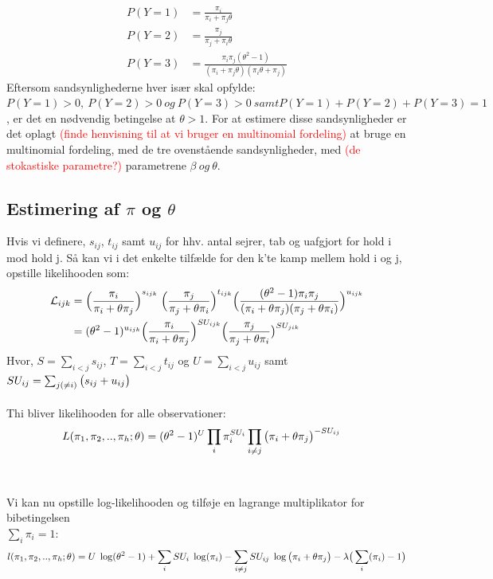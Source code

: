 \documentclass[11pt,a4paper]{article}
\begin{document}
\begin{align*}
P(Y=1) &= \frac{\pi_i}{\pi_i+\pi_j\theta}\\
P(Y=2) &= \frac{\pi_j}{\pi_j+\pi_i\theta}\\
P(Y=3) &= \frac{\pi_i\pi_j(\theta^2-1)}{(\pi_i+\pi_j\theta)(\pi_i\theta+\pi_j)}
\end{align*}
Eftersom sandsynlighederne hver især skal opfylde:
$P(Y=1)>0, \ P(Y=2)>0\ og \ P(Y=3)>0\ samt P(Y=1)+P(Y=2)+P(Y=3)=1$, er det en nødvendig betingelse at $\theta>1$.
For at estimere disse sandsynligheder er det oplagt \textcolor{red}{(finde henvisning til at vi bruger en multinomial fordeling)} at bruge en multinomial fordeling, med de tre ovenstående sandsynligheder, med \textcolor{red}{(de stokastiske parametre?)} parametrene $\beta \ og \ \theta$. 

\subsection{Estimering af $\pi$ og $\theta$ }
Hvis vi definere, $s_{ij}$, $t_{ij}$ samt $u_{ij}$ for hhv. antal sejrer, tab og uafgjort for hold i mod hold j. Så kan vi i det enkelte tilfælde for den k'te kamp mellem hold i og j, opstille likelihooden som: 
\begin{align*}
\mathcal{L}_{ijk} &= \Big{(}\frac{\pi_i}{\pi_i+\theta\pi_j}\Big{)}^{s_{ijk}}
\;\Big{(}\frac{\pi_j}{\pi_j+\theta\pi_i}\Big{)}^{t_{ijk}}
\Big{(}\frac{(\theta^2-1)\pi_i \pi_j}{(\pi_i+\theta\pi_j)(\pi_j+\theta\pi_i)}\Big{)}^{u_{ijk}}\\
&= (\theta^2-1)^{u_{ijk}}\Big{(}\frac{\pi_i}{\pi_i+\theta\pi_j}\Big{)}^{SU_{ijk}}\Big{(}\frac{\pi_j}{\pi_j+\theta\pi_i}\big{)}^{SU_{jik}}
\end{align*}
Hvor, $S=\sum_{i<j}s_{ij}$,  $T=\sum_{i<j}t_{ij}$ og $U=\sum_{i<j}u_{ij}$ samt $SU_{ij}=\sum_{j(\neq i)}\big{(}s_{ij}+u_{ij}\big{)}$ \\
\\
Thi bliver likelihooden for alle observationer:
\begin{align*}
L(\pi_1,\pi_2,..,\pi_h;\theta) &=(\theta^2-1)^U\prod_i\pi_i^{SU_i}\prod_{i\neq j}\big{(}\pi_i+\theta\pi_j\big{)}^{-SU_{ij}}
\end{align*}
\\\\
Vi kan nu opstille log-likelihooden og tilføje en lagrange multiplikator for bibetingelsen\\ $\sum_i\pi_i=1$:
\begin{align*}
l(\pi_1,\pi_2,..,\pi_h;\theta) 
&=U\;\log(\theta^2-1)+\sum_i SU_{i}\;\log(\pi_i)-\sum_{i \neq j}SU_{ij}\;\log\big{(}\pi_i+\theta \pi_j\big{)}-\lambda\big{(}\sum_i(\pi_i)-1\big{)}\\
\end{align*}
\end{document}

